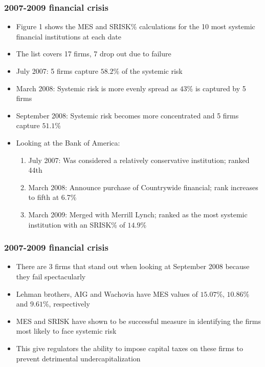\documentclass[11pt]{beamer}
\begin{document}

\begin{frame}
\frametitle{2007-2009 financial crisis}
\begin{itemize}
\item Figure 1 shows the MES and SRISK\% calculations for the 10 most systemic financial institutions at each date
\item The list covers 17 firms, 7 drop out due to failure
\item July 2007: 5 firms capture $58.2$\% of the systemic risk
\item March 2008: Systemic risk is more evenly spread as $43$\% is captured by 5 firms
\item September 2008: Systemic risk becomes more concentrated and 5 firms capture $51.1$\%
\item Looking at the Bank of America:
\begin{enumerate}
\item July 2007: Was considered a relatively conservative institution; ranked 44th
\item March 2008: Announce purchase of Countrywide financial; rank increases to fifth at 6.7\%
\item March 2009: Merged with Merrill Lynch; ranked as the most systemic institution with an SRISK\% of $14.9$\%
\end{enumerate}
\end{itemize}
\end{frame}


\begin{frame}
\frametitle{2007-2009 financial crisis}
\begin{itemize}
\item There are 3 firms that stand out when looking at September 2008 because they fail spectacularly
\item Lehman brothers, AIG and Wachovia have MES values of $15.07$\%, $10.86$\% and $9.61$\%, respectively
\item MES and SRISK have shown to be successful measure in identifying the firms most likely to face systemic risk
\item This give regulators the ability to impose capital taxes on these firms to prevent detrimental undercapitalization
\end{itemize}
\end{frame}
\end{document}

